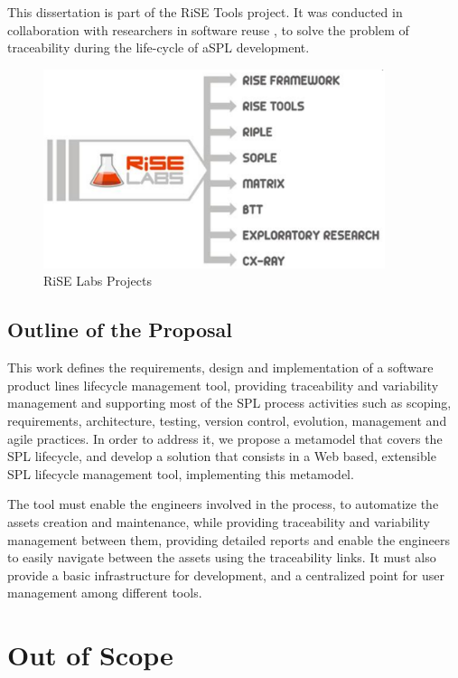 This dissertation is part of the \ac{RiSE} Tools project. It was conducted in collaboration with researchers in software reuse , to solve the problem of traceability during the life-cycle of a\acf{SPL} development.


\begin{figure}[htp]
\begin{center}
  \includegraphics[width=10cm]{chapters/introduction/rise-projects.png}
  \caption[RiSE Labs Projects]{RiSE Labs Projects}
  \label{fg:rise-projects}
\end{center}
\end{figure}

\subsection{Outline of the Proposal}
This work defines the requirements, design and implementation of a software product lines lifecycle management tool, providing traceability and variability management and supporting most of the SPL process activities such as scoping, requirements, architecture, testing, version control, evolution, management and agile practices. In order to address it, we propose a metamodel that covers the SPL lifecycle, and develop a solution that consists in a Web based, extensible SPL lifecycle management tool, implementing this metamodel.  

The tool must enable the engineers involved in the process, to automatize the assets creation and maintenance, while providing traceability and variability management between them, providing detailed reports and enable the engineers to easily navigate between the assets using the traceability links. It must also provide a basic infrastructure for development, and a centralized point for user management among different tools.


\section{Out of Scope}
\label{sc:outofscope}

